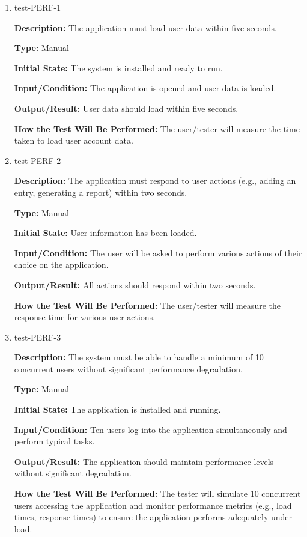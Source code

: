 \documentclass[12pt, titlepage]{article}
\begin{document}
\begin{enumerate}

\item{test-PERF-1\\}

\textbf{Description:} The application must load user data within five seconds.

\textbf{Type:} Manual
					
\textbf{Initial State:} The system is installed and ready to run.
					
\textbf{Input/Condition:} The application is opened and user data is loaded.
					
\textbf{Output/Result:} User data should load within five seconds.
					
\textbf{How the Test Will Be Performed:} The user/tester will measure the time
taken to load user account data.

\item{test-PERF-2\\}

\textbf{Description:} The application must respond to user actions (e.g., adding
an entry, generating a report) within two seconds.

\textbf{Type:} Manual
					
\textbf{Initial State:} User information has been loaded.
					
\textbf{Input/Condition:} The user will be asked to perform various actions of
their choice on the application.
					
\textbf{Output/Result:} All actions should respond within two seconds.
					
\textbf{How the Test Will Be Performed:} The user/tester will measure the
response time for various user actions.


\item{test-PERF-3\\}

\textbf{Description:} The system must be able to handle a minimum of 10
concurrent users without significant performance degradation.

\textbf{Type:} Manual
					
\textbf{Initial State:} The application is installed and running.
					
\textbf{Input/Condition:} Ten users log into the application simultaneously and
perform typical tasks.
					
\textbf{Output/Result:} The application should maintain performance levels
without significant degradation.
					
\textbf{How the Test Will Be Performed:} The tester will simulate 10 concurrent
users accessing the application and monitor performance metrics (e.g., load
times, response times) to ensure the application performs adequately under load.

\end{enumerate}
\end{document}
